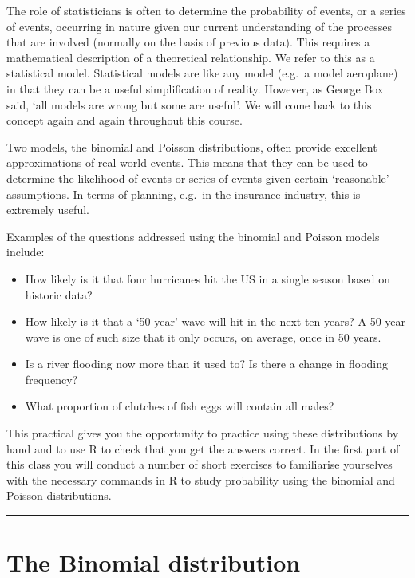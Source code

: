 \documentclass[
  11pt,
  a4paper,
]{book}
\providecommand{\tightlist}{%
  \setlength{\itemsep}{0pt}\setlength{\parskip}{0pt}}
\begin{document}
The role of statisticians is often to determine the probability of events, or a series of events, occurring in nature given our current understanding of the processes that are involved (normally on the basis of previous data). This requires a mathematical description of a theoretical relationship. We refer to this as a statistical model. Statistical models are like any model (e.g.~a model aeroplane) in that they can be a useful simplification of reality. However, as George Box said, `all models are wrong but some are useful'. We will come back to this concept again and again throughout this course.

Two models, the binomial and Poisson distributions, often provide excellent approximations of real-world events. This means that they can be used to determine the likelihood of events or series of events given certain `reasonable' assumptions. In terms of planning, e.g.~in the insurance industry, this is extremely useful.

Examples of the questions addressed using the binomial and Poisson models include:

\begin{itemize}
\tightlist
\item
  How likely is it that four hurricanes hit the US in a single season based on historic data?
\item
  How likely is it that a `50-year' wave will hit in the next ten years? A 50 year wave is one of such size that it only occurs, on average, once in 50 years.
\item
  Is a river flooding now more than it used to? Is there a change in flooding frequency?
\item
  What proportion of clutches of fish eggs will contain all males?
\end{itemize}

This practical gives you the opportunity to practice using these distributions by hand and to use R to check that you get the answers correct. In the first part of this class you will conduct a number of short exercises to familiarise yourselves with the necessary commands in R to study probability using the binomial and Poisson distributions.

\begin{center}\rule{0.5\linewidth}{0.5pt}\end{center}

\hypertarget{the-binomial-distribution}{%
\section{The Binomial distribution}\label{the-binomial-distribution}}
\end{document}

